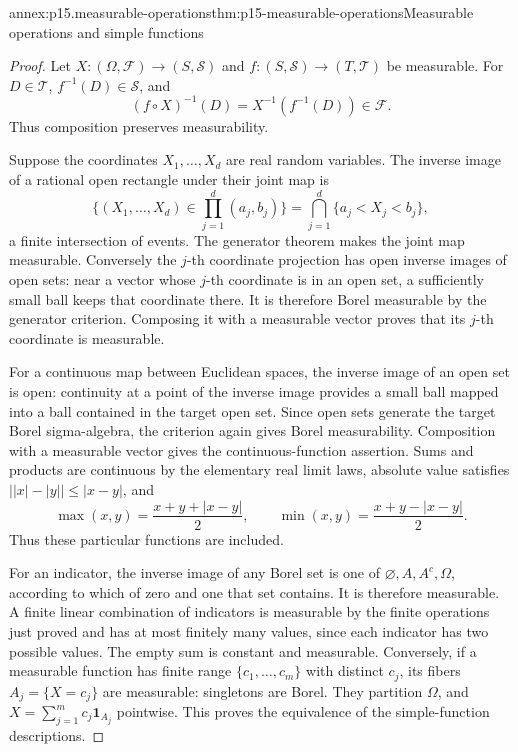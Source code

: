 \begin{annexitem}{annex:p15.measurable-operations}{thm:p15-measurable-operations}{Measurable operations and simple functions}
\begin{proof}
Let \(X:(\Omega,\mathcal F)\to(S,\mathcal S)\) and
\(f:(S,\mathcal S)\to(T,\mathcal T)\) be measurable. For
\(D\in\mathcal T\), \(f^{-1}(D)\in\mathcal S\), and
\[
 (f\circ X)^{-1}(D)=X^{-1}(f^{-1}(D))\in\mathcal F.
\]
Thus composition preserves measurability.

Suppose the coordinates \(X_1,\ldots,X_d\) are real random variables.
The inverse image of a rational open rectangle under their joint map is
\[
 \{(X_1,\ldots,X_d)\in\textstyle\prod_{j=1}^d(a_j,b_j)\}
       =\bigcap_{j=1}^d\{a_j<X_j<b_j\},
\]
a finite intersection of events. The generator theorem makes the joint
map measurable. Conversely the \(j\)-th coordinate projection has open
inverse images of open sets: near a vector whose \(j\)-th coordinate
is in an open set, a sufficiently small ball keeps that coordinate there.
It is therefore Borel measurable by the generator criterion. Composing
it with a measurable vector proves that its \(j\)-th coordinate is
measurable.

For a continuous map between Euclidean spaces, the inverse image of an
open set is open: continuity at a point of the inverse image provides a
small ball mapped into a ball contained in the target open set. Since
open sets generate the target Borel sigma-algebra, the criterion again
gives Borel measurability. Composition with a measurable vector gives
the continuous-function assertion. Sums and products are continuous by
the elementary real limit laws, absolute value satisfies
\(\bigl||x|-|y|\bigr|\leq|x-y|\), and
\[
 \max(x,y)=\frac{x+y+|x-y|}{2},\qquad
 \min(x,y)=\frac{x+y-|x-y|}{2}.
\]
Thus these particular functions are included.

For an indicator, the inverse image of any Borel set is one of
\(\varnothing,A,A^c,\Omega\), according to which of zero and one
that set contains. It is therefore measurable. A finite linear
combination of indicators is measurable by the finite operations just
proved and has at most finitely many values, since each indicator has
two possible values. The empty sum is constant and measurable.
Conversely, if a measurable function has finite range
\(\{c_1,\ldots,c_m\}\) with distinct \(c_j\), its fibers
\(A_j=\{X=c_j\}\) are measurable: singletons are Borel. They
partition \(\Omega\), and
\(X=\sum_{j=1}^m c_j\mathbf1_{A_j}\) pointwise. This proves the
equivalence of the simple-function descriptions.
\end{proof}
\end{annexitem}

